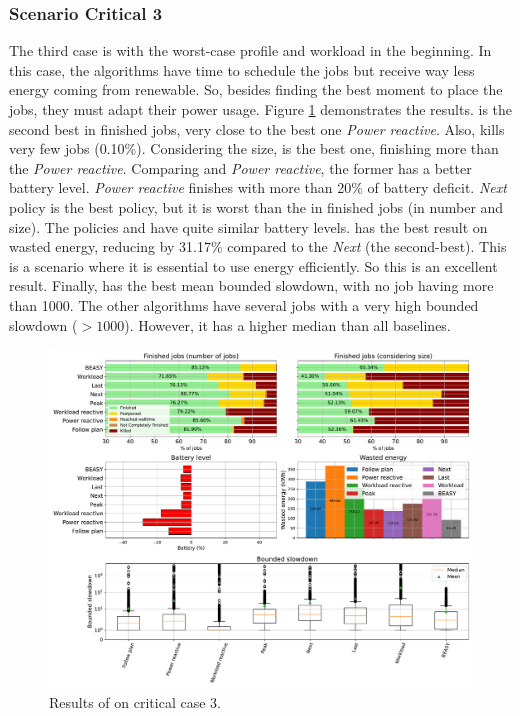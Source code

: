 \clearpage

\subsubsection{Scenario Critical 3}

The third case is with the worst-case profile and workload in the beginning. In this case, the algorithms have time to schedule the jobs but receive way less energy coming from renewable. So, besides finding the best moment to place the jobs, they must adapt their power usage. Figure \ref{fig:beasy_critical_3} demonstrates the results. \emph{\systemName} is the second best in finished jobs, very close to the best one \emph{Power reactive}. Also, \emph{\systemName} kills very few jobs (0.10\%). Considering the size, \emph{\systemName} is the best one, finishing more than the \emph{Power reactive}. Comparing \emph{\systemName} and \emph{Power reactive}, the former has a better battery level. \emph{Power reactive} finishes with more than 20\% of battery deficit. \emph{Next} policy is the best policy, but it is worst than the \emph{\systemName} in finished jobs (in number and size). The policies and \emph{\systemName} have quite similar battery levels. \emph{\systemName} has the best result on wasted energy, reducing by 31.17\% compared to the \emph{Next} (the second-best). This is a scenario where it is essential to use energy efficiently. So this is an excellent result. Finally, \emph{\systemName} has the best mean bounded slowdown, with no job having more than 1000. The other algorithms have several jobs with a very high bounded slowdown ($>1000$). However, it has a higher median than all baselines.

\begin{figure}[!htb]
    \centering
    \includegraphics[scale=0.39]{Images/Heuristic/profile_worst_workload_1_with_noise.pdf}
    \caption{Results of \emph{\systemName} on critical case 3.}
    \label{fig:beasy_critical_3}
\end{figure}


